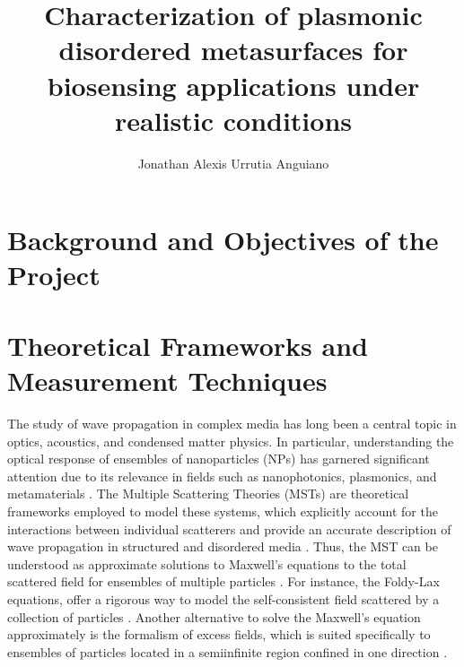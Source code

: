 \documentclass[11pt]{Latex/Classes/PhDthesisPSnPDF}
\author{Jonathan Alexis Urrutia Anguiano}
\title{Characterization of plasmonic disordered metasurfaces for biosensing applications under realistic conditions}
\begin{document}
%
\maketitle

%
\setcounter{secnumdepth}{3} %
\setcounter{tocdepth}{3}    %
 
\tableofcontents            %


\mainmatter
\def\baselinestretch{1}                   %

%
\chapter*{Background and Objectives of the  Project}
	\label{chapter:intro}
	
		


\chapter{Theoretical Frameworks and Measurement Techniques}
 	\label{ch:Theory}
%	
	The study of wave propagation in complex media has long been a central topic in optics, acoustics, and condensed matter physics. In particular, understanding the optical response of ensembles of nanoparticles (NPs) has garnered significant attention due to its relevance in fields such as nanophotonics, plasmonics, and metamaterials \cite{kabashin_plasmonic_2009,qiu_dual_2020,kabashin_label-free_2023}. The Multiple Scattering Theories (MSTs)  are theoretical frameworks  employed to model these systems, which explicitly account for the interactions between individual scatterers and provide an accurate description of wave propagation in structured and disordered media \cite{loiko_monolayers_1998,barrera1991optical,reyes2018analytical}. Thus, the MST can be understood as approximate solutions to Maxwell's equations to the total scattered field for ensembles of multiple particles \cite{loiko_monolayers_1998}. For instance, the Foldy-Lax equations, offer a rigorous way to model the self-consistent field scattered by a collection of particles \cite{foldy_multiple_1945}. Another alternative to solve the Maxwell's equation approximately is the formalism of excess fields, which is suited specifically to ensembles of particles located in a semiinfinite region confined in one direction \cite{bedeaux_optical_2004}.
	
\end{document}
